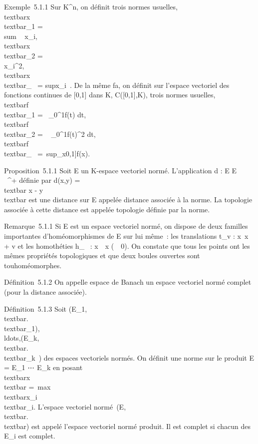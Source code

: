 \documentclass[]{article}
\begin{document}
Exemple~5.1.1 Sur K^n, on définit trois normes usuelles,
\\textbar{}x\\textbar{}\_1
= \\sum ~
\textbar{}x\_i\textbar{},
\\textbar{}x\\textbar{}\_2 =
\sqrt\\\sum
 \textbar{}x\_i\textbar{}^2,
\\textbar{}x\\textbar{}\_\infty~
= sup\textbar{}x\_i~\textbar{}. De la
même fa\ccon, on définit sur l'espace vectoriel des
fonctions continues de {[}0,1{]} dans K, C({[}0,1{]},K), trois normes
usuelles,
\\textbar{}f\\textbar{}\_1
=\int ~
\_0^1\textbar{}f(t)\textbar{} dt,
\\textbar{}f\\textbar{}\_2 =
\sqrt\int ~
\_0^1\textbar{}f(t)\textbar{}^2 dt,
\\textbar{}f\\textbar{}\_\infty~
=\
sup\_x\in{[}0,1{]}\textbar{}f(x)\textbar{}.

Proposition~5.1.1 Soit E un K-espace vectoriel normé. L'application d :
E \times E \rightarrow~ \mathbb{R}~^+ définie par d(x,y) =\\textbar{} x
- y\\textbar{} est une distance sur E appelée distance
associée à la norme. La topologie associée à cette distance est appelée
topologie définie par la norme.

Remarque~5.1.1 Si E est un espace vectoriel normé, on dispose de deux
familles importantes d'homéomorphismes de E sur lui même~: les
translations t\_v : x\mapsto~x + v et les
homothéties h\_\lambda~ : x\mapsto~\lambda~x
(\lambda~\neq~0). On constate que tous les points ont
les mêmes propriétés topologiques et que deux boules ouvertes sont
tou\jmathours homéomorphes.

Définition~5.1.2 On appelle espace de Banach un espace vectoriel normé
complet (pour la distance associée).

Définition~5.1.3 Soit
(E\_1,\\textbar{}.\\textbar{}\_1),\\ldots,(E\_k,\\textbar{}.\\textbar{}\_k~)
des espaces vectoriels normés. On définit une norme sur le produit E =
E\_1 \times⋯ \times E\_k en posant
\\textbar{}x\\textbar{}
=\
max\\textbar{}x\_i\\textbar{}\_i.
L'espace vectoriel
normé~(E,\\textbar{}.\\textbar{}) est
appelé l'espace vectoriel normé produit. Il est complet si chacun des
E\_i est complet.
\end{document}
